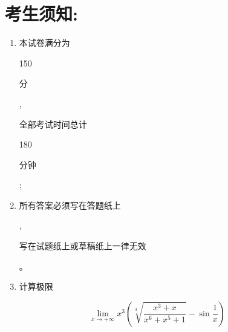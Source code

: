 \documentclass[10pt]{article}
\begin{document}
\section{考生须知:}
\begin{enumerate}
  \item \begin{CJK}{UTF8}{mj}本试卷满分为\end{CJK} 150 \begin{CJK}{UTF8}{mj}分\end{CJK}, \begin{CJK}{UTF8}{mj}全部考试时间总计\end{CJK} 180 \begin{CJK}{UTF8}{mj}分钟\end{CJK};

  \item \begin{CJK}{UTF8}{mj}所有答案必须写在答题纸上\end{CJK}, \begin{CJK}{UTF8}{mj}写在试题纸上或草稿纸上一律无效\end{CJK}。

  \item \begin{CJK}{UTF8}{mj}计算极限\end{CJK}

\end{enumerate}
$$
\lim _{x \rightarrow+\infty} x^{3}\left(\sqrt[3]{\frac{x^{3}+x}{x^{6}+x^{5}+1}}-\sin \frac{1}{x}\right)
$$
\end{document}
